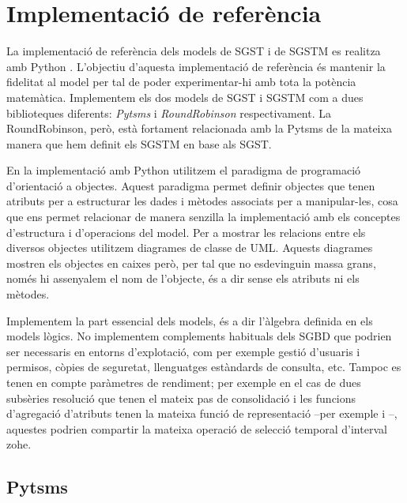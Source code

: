 

\chapter{Implementació de referència}
\label{sec:implementacio:python}


La implementació de referència dels models de \gls{SGST} i de \gls{SGSTM}
es realitza amb Python \parencite{python:doc2}. L'objectiu d'aquesta
implementació de referència és mantenir la fidelitat al model per tal
de poder experimentar-hi amb tota la potència matemàtica.
Implementem els dos models de \gls{SGST} i \gls{SGSTM} com a dues biblioteques
diferents: \emph{Pytsms} i \emph{RoundRobinson} respectivament. La
RoundRobinson, però, està fortament relacionada amb la
Pytsms de la mateixa manera que hem definit els \gls{SGSTM} en base
als \gls{SGST}.


En la implementació amb Python utilitzem el paradigma de programació
d'orientació a objectes. Aquest paradigma permet definir objectes que
tenen atributs per a estructurar les dades i mètodes associats per a
manipular-les, cosa que ens permet relacionar de manera senzilla la
implementació amb els conceptes d'estructura i d'operacions del model.
Per a mostrar les relacions entre els diversos objectes utilitzem
diagrames de classe de \gls{UML}. Aquests diagrames mostren els
objectes en caixes però, per tal que no esdevinguin massa grans, només
hi assenyalem el nom de l'objecte, és a dir sense els atributs ni els
mètodes.




Implementem la part essencial dels models, és a dir l'àlgebra definida
en els models lògics. No implementem complements habituals dels
\gls{SGBD} que podrien ser necessaris en entorns d'explotació, com per
exemple gestió d'usuaris i permisos, còpies de seguretat, llenguatges
estàndards de consulta, etc.  Tampoc es tenen en compte paràmetres de
rendiment; per exemple en el cas de dues subsèries resolució que tenen
el mateix pas de consolidació i les funcions d'agregació d'atributs
tenen la mateixa funció de representació --per exemple
 i --,
aquestes podrien compartir la mateixa operació de
selecció temporal d'interval \gls{zohe}.



\section{Pytsms}

